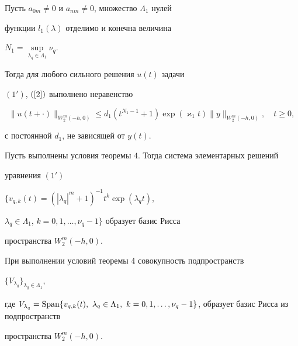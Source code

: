  


\begin{thm} 


Пусть $a_{0m}\ne 0$ и $a_{nm}\ne 0$, множество $\Lambda_1$ нулей 


функции $l_1(\lambda)$ отделимо и конечна величина 


$N_1=\sup\limits_{\lambda_q\in\Lambda_1}\nu_q$. 


Тогда для любого сильного решения $u(t)$ задачи  


$(1')$, $(\ref{2})$ выполнено неравенство 


\begin{equation} 


\label{9} 


\|u(t+\cdot)\|_{W^m_2(-h,0)}\le d_1(t^{N_1-1}+1) 


\exp(\varkappa_1t)\|y\|_{W^m_2(-h,0)},\quad t\ge 0, 


\end{equation} 


с постоянной $d_1$, не зависящей от $y(t)$. 


\end{thm} 


 


\begin{thm} 


Пусть выполнены условия теоремы $4$. Тогда система элементарных решений 


уравнения $(1')$ 


$\{v_{q,k}(t)=(|\lambda_q|^m+1)^{-1}t^k\exp(\lambda_q t)$, 


$\lambda_q\in\Lambda_1$, $k=0,1,\dotsc,\nu_q-1\}$ образует базис Рисса 


пространства $W^m_2(-h,0)$. 


\end{thm} 


 


\begin{cornonum} 


При выполнении условий теоремы 4 совокупность подпространств 


$\{V_{\lambda_q}\}_{\lambda_q\in\Lambda_1}$, 


где $V_{\lambda_q}=\Span\{v_{q,k}(t),\ \lambda_q\in\Lambda_1,\ 


k=0,1,\dotsc,\nu_q-1\}$, образует базис Рисса из подпространств 


пространства $W^m_2(-h,0)$. 


\end{cornonum} 


